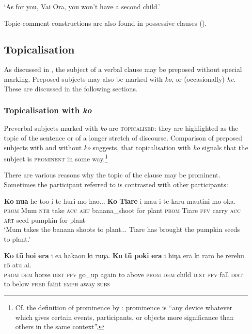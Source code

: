 \glt
‘As for you, Vai Ora, you won’t have a second child.’ \textstyleExampleref{[R301.077]} 
\z

Topic-comment constructions are also found in possessive clauses ().

\subsection{Topicalisation}\label{sec:8.6.2}
As discussed in , the subject of a verbal clause may be preposed without special marking. Preposed subjects may also be marked with \textit{ko}, or (occasionally) \textit{he}. These are discussed in the following sections.

\subsubsection[Topicalisation with ko]{Topicalisation with \textit{ko}}\label{sec:8.6.2.1}
Preverbal subjects marked with \textit{ko} are \textsc{topicalised}: they are highlighted as the topic of the sentence or of a longer stretch of discourse. Comparison of preposed subjects with and without \textit{ko} suggests, that topicalisation with \textit{ko} signals that the subject is \textsc{prominent}\textsc{} in some way.\footnote{\label{fn:423}Cf. the definition of prominence by \citet[50]{Callow1974}: prominence is “any device whatever which gives certain events, participants, or objects more significance than others in the same context”.} 

There are various reasons why the topic of the clause may be prominent. Sometimes the participant referred to is contrasted with other participants:

\ea\label{ex:8.81}
\gll \textbf{Ko} \textbf{nua} he to{\ꞌ}o i te huri mo hao... \textbf{Ko} \textbf{Tiare} i ma{\ꞌ}u  i te karu mautini mo {\ꞌ}oka.\\
\textsc{prom} Mum \textsc{ntr} take \textsc{acc} \textsc{art} banana\_shoot for plant \textsc{prom} Tiare \textsc{pfv} carry  \textsc{acc} \textsc{art} seed pumpkin for plant\\

\glt 
‘Mum takes the banana shoots to plant... Tiare has brought the pumpkin seeds to plant.’ \textstyleExampleref{[R184.055–056]}
\z

\ea\label{ex:8.82}
\gll \textbf{Ko} \textbf{tū} \textbf{hoi} \textbf{era} i e{\ꞌ}a haka{\ꞌ}ou ki ruŋa. \textbf{Ko} \textbf{tū} \textbf{poki} \textbf{era} i hiŋa era ki raro he rerehu rō atu {\ꞌ}ai. \\
\textsc{prom} \textsc{dem} horse \textsc{dist} \textsc{pfv} go\_up again to above \textsc{prom} \textsc{dem} child \textsc{dist} \textsc{pfv} fall \textsc{dist} to below \textsc{pred} faint \textsc{emph} away \textsc{subs} \\

